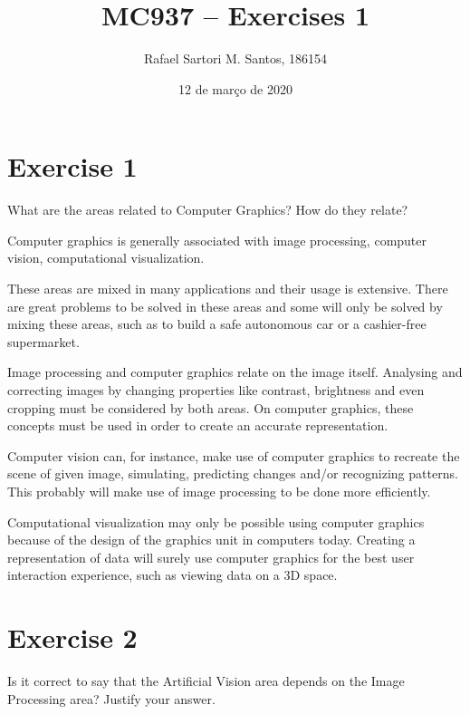\documentclass[english,a4paper]{article}
\title{MC937 -- Exercises 1}
\author{Rafael Sartori M. Santos, 186154}
\date{12 de março de 2020}
\begin{document}
\maketitle

\section*{Exercise 1}

  What are the areas related to Computer Graphics?  How do they relate?

  \begin{mdframed}
    \begin{small}
      Computer graphics is generally associated with image processing, computer vision, computational visualization.

      These areas are mixed in many applications and their usage is extensive. There are great problems to be solved in these areas and some will only be solved by mixing these areas, such as to build a safe autonomous car or a cashier-free supermarket.

      Image processing and computer graphics relate on the image itself. Analysing and correcting images by changing properties like contrast, brightness and even cropping must be considered by both areas. On computer graphics, these concepts must be used in order to create an accurate representation.

      Computer vision can, for instance, make use of computer graphics to recreate the scene of given image, simulating, predicting changes and/or recognizing patterns. This probably will make use of image processing to be done more efficiently.

      Computational visualization may only be possible using computer graphics because of the design of the graphics unit in computers today. Creating a representation of data will surely use computer graphics for the best user interaction experience, such as viewing data on a 3D space.
    \end{small}
  \end{mdframed}


\section*{Exercise 2}

  Is it correct to say that the Artificial Vision area depends on the Image Processing area? Justify your answer.
\end{document}
